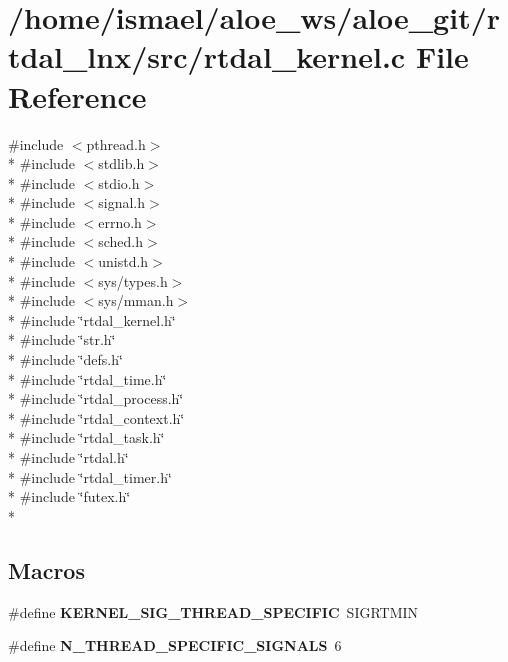 \section{/home/ismael/aloe\-\_\-ws/aloe\-\_\-git/rtdal\-\_\-lnx/src/rtdal\-\_\-kernel.c File Reference}
\label{rtdal__kernel_8c}
{\ttfamily \#include $<$pthread.\-h$>$}\\*
{\ttfamily \#include $<$stdlib.\-h$>$}\\*
{\ttfamily \#include $<$stdio.\-h$>$}\\*
{\ttfamily \#include $<$signal.\-h$>$}\\*
{\ttfamily \#include $<$errno.\-h$>$}\\*
{\ttfamily \#include $<$sched.\-h$>$}\\*
{\ttfamily \#include $<$unistd.\-h$>$}\\*
{\ttfamily \#include $<$sys/types.\-h$>$}\\*
{\ttfamily \#include $<$sys/mman.\-h$>$}\\*
{\ttfamily \#include \char`\"{}rtdal\-\_\-kernel.\-h\char`\"{}}\\*
{\ttfamily \#include \char`\"{}str.\-h\char`\"{}}\\*
{\ttfamily \#include \char`\"{}defs.\-h\char`\"{}}\\*
{\ttfamily \#include \char`\"{}rtdal\-\_\-time.\-h\char`\"{}}\\*
{\ttfamily \#include \char`\"{}rtdal\-\_\-process.\-h\char`\"{}}\\*
{\ttfamily \#include \char`\"{}rtdal\-\_\-context.\-h\char`\"{}}\\*
{\ttfamily \#include \char`\"{}rtdal\-\_\-task.\-h\char`\"{}}\\*
{\ttfamily \#include \char`\"{}rtdal.\-h\char`\"{}}\\*
{\ttfamily \#include \char`\"{}rtdal\-\_\-timer.\-h\char`\"{}}\\*
{\ttfamily \#include \char`\"{}futex.\-h\char`\"{}}\\*
\subsection*{Macros}
\begin{DoxyCompactItemize}
\item 
\#define {\bf K\-E\-R\-N\-E\-L\-\_\-\-S\-I\-G\-\_\-\-T\-H\-R\-E\-A\-D\-\_\-\-S\-P\-E\-C\-I\-F\-I\-C}~S\-I\-G\-R\-T\-M\-I\-N
\item 
\#define {\bf N\-\_\-\-T\-H\-R\-E\-A\-D\-\_\-\-S\-P\-E\-C\-I\-F\-I\-C\-\_\-\-S\-I\-G\-N\-A\-L\-S}~6
\end{DoxyCompactItemize}

